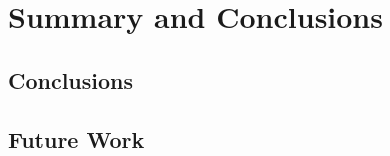 \chapter{Summary and Conclusions}
\label{chap:conclusion}

\section{Conclusions}

\section{Future Work}
